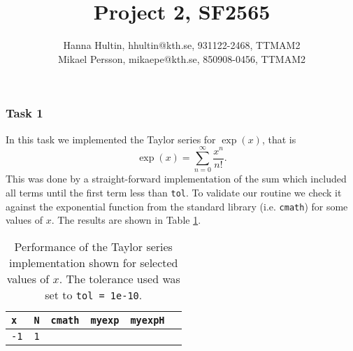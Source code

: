\documentclass[a4paper,10pt]{article}
\title{Project 2, SF2565}
\author{Hanna Hultin, hhultin@kth.se, 931122-2468, TTMAM2 \\ Mikael Persson, mikaepe@kth.se, 850908-0456, TTMAM2}
\begin{document}
\maketitle

\subsubsection*{Task 1}
In this task we implemented the Taylor series for $\exp (x)$, that is 
\begin{equation*}
  \exp(x) = \sum_{n=0}^\infty \frac{x^{n}}{n!}.
\end{equation*}
This was done by a straight-forward implementation of the 
sum which included all terms until the first term less than \texttt{tol}.
To validate our routine we check it against the exponential function from the 
standard library (i.e. \texttt{cmath}) for some values of $x$. 
The results are shown in Table \ref{TABtask1}.


\begin{table}[!ht]
\centering 
  \begin{minipage}[t]{105mm}
    \caption{
      Performance of the Taylor series implementation shown for selected values of 
      $x$. The tolerance used was set to \texttt{tol = 1e-10}. 
    } 
    \label{TABtask1}
  \end{minipage}

  \vspace{5mm}
  \begin{tabular}{l l l l l l} 
    \texttt{x}&\texttt{N}&\texttt{cmath} & \texttt{myexp} & \texttt{myexpH} \\
    \hline
    \texttt{-1}	& \texttt{1}	&	

  \end{tabular}
\end{table}
\end{document}

